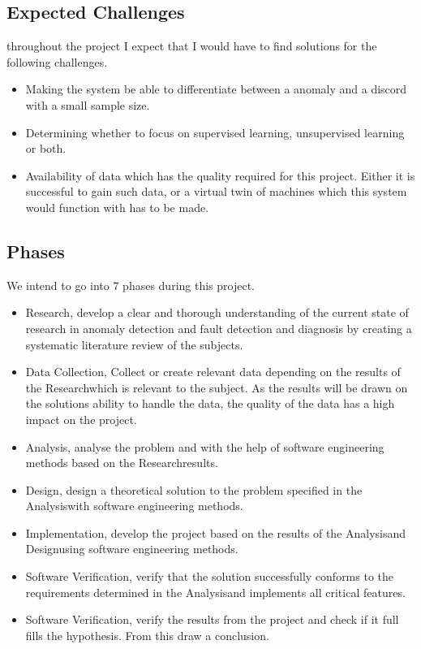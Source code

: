 \documentclass[a4paper,8pt]{article}
\newcommand{\Phases}{7 }
\newcommand{\phaseq}{Research}
\newcommand{\phasew}{Data Collection}
\newcommand{\phasee}{Analysis}
\newcommand{\phaser}{Design}
\newcommand{\phaset}{Implementation}
\newcommand{\phasey}{Software Verification}
\begin{document}
	\subsection{Expected Challenges}
		throughout the project I expect that I would have to find solutions for the following challenges.
		\begin{itemize}
			\item Making the system be able to differentiate between a anomaly and a discord with a small sample size.
			\item Determining whether to focus on supervised learning, unsupervised learning or both.
			\item Availability of data which has the quality required for this project. Either it is successful to gain such data, or a virtual twin of machines which this system would function with has to be made.
		\end{itemize}
	\subsection{Phases}
	We intend to go into \Phases phases during this project.
		\begin{itemize}
			\item \phaseq, develop a clear and thorough understanding of the current state of research in anomaly detection and fault detection and diagnosis by creating a systematic literature review of the subjects.
			\item \phasew, Collect or create relevant data depending on the results of the \phaseq which is relevant to the subject. As the results will be drawn on the solutions ability to handle the data, the quality of the data has a high impact on the project.
			\item \phasee, analyse the problem and with the help of software engineering methods based on the \phaseq \space results.
			\item \phaser, design a theoretical solution to the problem specified in the \phasee with software engineering methods.
			\item \phaset, develop the project based on the results of the \phasee and \phaser using software engineering methods.
			\item \phasey, verify that the solution successfully conforms to the requirements determined in the \phasee and implements all critical features.
			\item \phasey, verify the results from the project and check if it full fills the hypothesis. From this draw a conclusion.
		\end{itemize}
	
\end{document}
